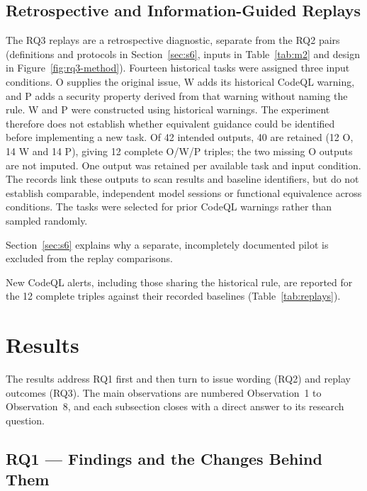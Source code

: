 \documentclass[acmsmall,screen,nonacm,review]{acmart}
\begin{document}
\subsection{Retrospective and Information-Guided Replays}\label{sec:rq3-design}

The RQ3 replays are a retrospective diagnostic, separate from the RQ2 pairs (definitions and protocols in Section~\ref{sec:s6}, inputs in Table~\ref{tab:m2} and design in Figure~\ref{fig:rq3-method}). Fourteen historical tasks were assigned three input conditions. O supplies the original issue, W adds its historical CodeQL warning, and P adds a security property derived from that warning without naming the rule. W and P were constructed using historical warnings. The experiment therefore does not establish whether equivalent guidance could be identified before implementing a new task. Of 42 intended outputs, 40 are retained (12 O, 14 W and 14 P), giving 12 complete O/W/P triples; the two missing O outputs are not imputed. One output was retained per available task and input condition. The records link these outputs to scan results and baseline identifiers, but do not establish comparable, independent model sessions or functional equivalence across conditions. The tasks were selected for prior CodeQL warnings rather than sampled randomly.

Section~\ref{sec:s6} explains why a separate, incompletely documented pilot is excluded from the replay comparisons.

New CodeQL alerts, including those sharing the historical rule, are reported for the 12 complete triples against their recorded baselines (Table~\ref{tab:replays}). 

\section{Results}\label{sec:results}

The results address RQ1 first and then turn to issue wording (RQ2) and replay outcomes (RQ3). The main observations are numbered Observation~1 to Observation~8, and each subsection closes with a direct answer to its research question.

\subsection{RQ1 --- Findings and the Changes Behind Them}\label{sec:rq1-roles}
\end{document}
